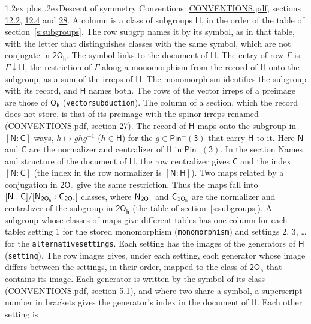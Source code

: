\documentclass[10pt,a4paper]{article}
\makeatletter
\renewcommand\section{\@startsection{section}{1}{\z@}{-3ex plus -1ex minus -.2ex}%
  {1.2ex plus .2ex}{\normalfont\large\sffamily\bfseries\color{parttitle}}}
\numberwithin{equation}{section}
\newcommand{\grp}[1]{\mathsf{#1}}
\newcommand{\grpindex}[2]{[#1 : #2]}
\newcommand{\restr}[2]{#1\!\downarrow#2}
\newcommand{\hairsp}{\mkern1mu}
\makeatother
\begin{document}
\section{Descent of symmetry}\label{s:subduction}
Conventions: \href{../../CONVENTIONS.pdf}{CONVENTIONS.pdf}, sections \href{../../../rotation/CONVENTIONS.pdf\#conv.12.2}{12.2}, \href{../../../rotation/CONVENTIONS.pdf\#conv.12.4}{12.4} and \href{../../CONVENTIONS.pdf\#conv.28}{28}.
A column is a class of subgroups $\grp{H}$, in the order of the table of section~\ref{s:subgroups}. The row subgrp names it by its symbol, as in that table, with the letter that distinguishes classes with the same symbol, which are not conjugate in $\grp{2O_{h}}$. The symbol links to the document of $\grp{H}$. The entry of row $\Gamma$ is $\restr{\Gamma}{\grp{H}}$, the restriction of $\Gamma$ along a monomorphism from the record of $\grp{H}$ onto the subgroup, as a sum of the irreps of $\grp{H}$. The monomorphism identifies the subgroup with its record, and $\grp{H}$ names both. The rows of the vector irreps of a preimage are those of \href{../../../rotation/data/pdf/Oh.pdf}{$\grp{O_{h}}$} (\texttt{vectorsubduction}). The column of a section, which the record does not store, is that of its preimage with the spinor irreps renamed (\href{../../CONVENTIONS.pdf}{CONVENTIONS.pdf}, section \href{../../CONVENTIONS.pdf\#conv.27}{27}). \label{n:group.normalizer.o3}\label{n:group.centralizer.o3}\label{n:element.h}The record of $\grp{H}$ maps onto the subgroup in $\grpindex{\grp{N}}{\grp{C}}$ ways, $h \mapsto g h g^{-1}$ ($h \in \grp{H}$) for the $g \in \grp{Pin^{-}(3)}$ that carry $\grp{H}$ to it. Here $\grp{N}$ and $\grp{C}$ are the normalizer and centralizer of $\grp{H}$ in \href{Pinminus3.pdf}{$\grp{Pin^{-}(3)}$}. In the section Names and structure of the document of $\grp{H}$, the row centralizer gives $\grp{C}$ and the index $\grpindex{\grp{N}}{\grp{C}}$ (the index in the row normalizer is $\grpindex{\grp{N}}{\grp{H}}$). Two maps related by a conjugation in $\grp{2O_{h}}$ give the same restriction. Thus the maps fall into $\grpindex{\grp{N}}{\grp{C}}/\grpindex{\grp{N}_{\hairsp \grp{2O_{h}}}}{\grp{C}_{\hairsp \grp{2O_{h}}}}$ classes, where $\grp{N}_{\hairsp \grp{2O_{h}}}$ and $\grp{C}_{\hairsp \grp{2O_{h}}}$ are the normalizer and centralizer of the subgroup in $\grp{2O_{h}}$ (the table of section~\ref{s:subgroups}). \label{n:head.setting}A subgroup whose classes of maps give different tables has one column for each table: setting 1 for the stored monomorphism (\texttt{monomorphism}) and settings 2, 3, \dots{} for the \texttt{alternativesettings}. Each setting has the images of the generators of $\grp{H}$ (\texttt{setting}). \label{n:head.images}The row images gives, under each setting, each generator whose image differs between the settings, in their order, mapped to the class of $\grp{2O_{h}}$ that contains its image. \label{n:element.generator.index}Each generator is written by the symbol of its class (\href{../../CONVENTIONS.pdf}{CONVENTIONS.pdf}, section \href{../../../rotation/CONVENTIONS.pdf\#conv.5.1}{5.1}), and where two share a symbol, a superscript number in brackets gives the generator's index in the document of $\grp{H}$. \label{n:irrep.Delta}Each other setting is 
\end{document}

